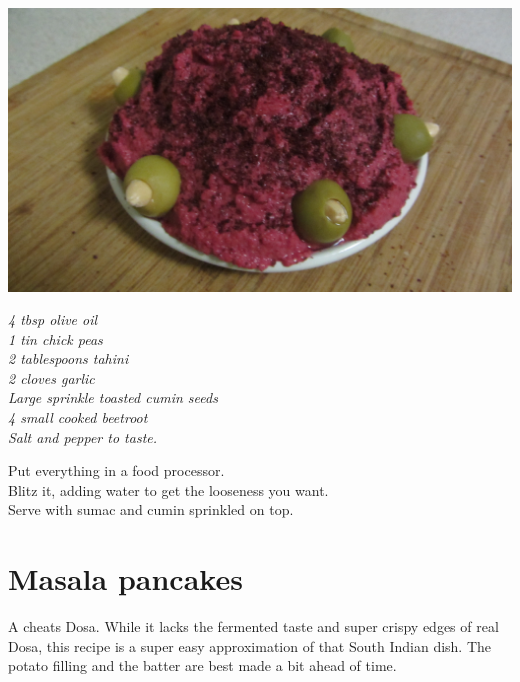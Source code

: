 \documentclass{tufte-book}
\begin{document}
\begin{marginfigure}%
  \includegraphics[width=\linewidth]{beetroothummus.png}
\end{marginfigure}

\smallskip
\emph{4 tbsp olive oil
\\1 tin chick peas
\\2 tablespoons tahini
\\2 cloves garlic
\\Large sprinkle toasted cumin seeds
\\4 small cooked beetroot
\\Salt and pepper to taste.
}

\smallskip
Put everything in a food processor.
\\Blitz it, adding water to get the looseness you want. 
\\Serve with sumac and cumin sprinkled on top.

\section{Masala pancakes}

A cheats Dosa. While it lacks the fermented taste and super crispy edges of real Dosa, this recipe is a super easy approximation of that South Indian dish. The potato filling and the batter are best made a bit ahead of time.
\end{document}
